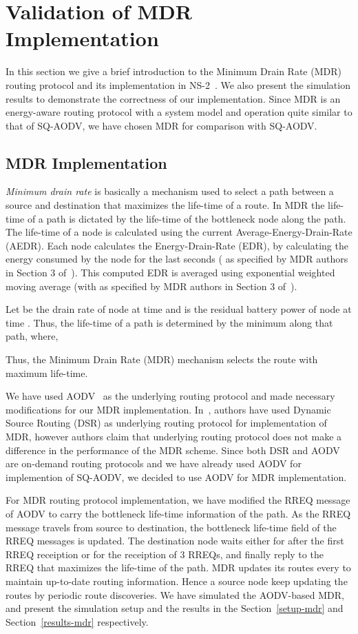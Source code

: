 \section{Validation of MDR Implementation}
\label{MDR-verification}
In this section we give a brief introduction to the Minimum Drain Rate (MDR)~\cite{mdr} routing protocol and its implementation in NS-2~\cite{NS-2}. We also present the simulation results to demonstrate the correctness of our implementation.
Since MDR is an energy-aware routing protocol with a system model and operation quite similar to that of SQ-AODV, we have chosen MDR for comparison with SQ-AODV.

\subsection{MDR Implementation}
\label{mdr-implementation}
\textit{Minimum drain rate} is basically a mechanism used to select a path between a source and destination that maximizes the life-time of a route. In MDR the life-time of a path is dictated by the life-time of the bottleneck node along the path. The life-time of a node is calculated using the current Average-Energy-Drain-Rate (AEDR). Each node calculates the Energy-Drain-Rate (EDR), by calculating the energy consumed by the node for the last  seconds ( as specified by MDR authors in Section 3 of~\cite{mdr}). This computed EDR is averaged using exponential weighted moving average (with  as specified by MDR authors in Section 3 of~\cite{mdr}).

Let  be the drain rate of node  at time  and  is the residual battery power of node  at time . Thus, the life-time of a path is determined by the minimum  along that path, where,

Thus, the Minimum Drain Rate (MDR) mechanism selects the route with maximum life-time.

We have used AODV~\cite{aodv} as the underlying routing protocol and made necessary modifications for our MDR implementation. In~\cite{mdr}, authors have used Dynamic Source Routing (DSR) as underlying routing protocol for implementation of MDR, however authors claim that underlying routing protocol does not make a difference in the performance of the MDR scheme. Since both DSR and AODV are on-demand routing protocols and we have already used AODV for implemention of SQ-AODV, we decided to use AODV for MDR implementation.

For MDR routing protocol implementation, we have modified the RREQ message of AODV to carry the bottleneck life-time information of the path. As the RREQ message travels from source to destination, the bottleneck life-time field of the RREQ messages is updated. The destination node waits either for \textbf{} after the first RREQ receiption or for the receiption of 3 RREQs, and finally reply to the RREQ that maximizes the life-time of the path. MDR updates its routes every  to maintain up-to-date routing information. Hence a source node keep updating the routes by periodic route discoveries. We have simulated the AODV-based MDR, and present the simulation setup and the results in the Section~\ref{setup-mdr} and Section~\ref{results-mdr} respectively.

